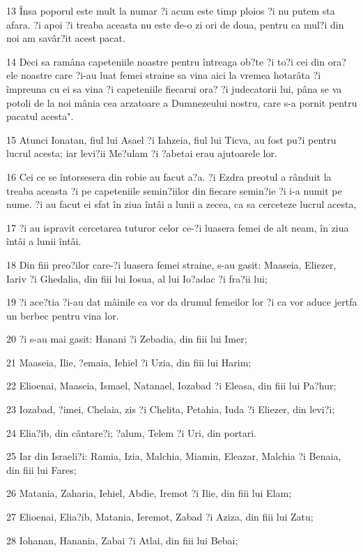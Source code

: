 \par 13 Însa poporul este mult la numar ?i acum este timp ploios ?i nu putem sta afara. ?i apoi ?i treaba aceasta nu este de-o zi ori de doua, pentru ca mul?i din noi am savâr?it acest pacat.
\par 14 Deci sa ramâna capeteniile noastre pentru întreaga ob?te ?i to?i cei din ora?ele noastre care ?i-au luat femei straine sa vina aici la vremea hotarâta ?i împreuna cu ei sa vina ?i capeteniile fiecarui ora? ?i judecatorii lui, pâna se va potoli de la noi mânia cea arzatoare a Dumnezeului nostru, care s-a pornit pentru pacatul acesta".
\par 15 Atunci Ionatan, fiul lui Asael ?i Iahzeia, fiul lui Ticva, au fost pu?i pentru lucrul acesta; iar levi?ii Me?ulam ?i ?abetai erau ajutoarele lor.
\par 16 Cei ce se întorsesera din robie au facut a?a. ?i Ezdra preotul a rânduit la treaba aceasta ?i pe capeteniile semin?iilor din fiecare semin?ie ?i i-a numit pe nume. ?i au facut ei sfat în ziua întâi a lunii a zecea, ca sa cerceteze lucrul acesta,
\par 17 ?i au ispravit cercetarea tuturor celor ce-?i luasera femei de alt neam, în ziua întâi a lunii întâi.
\par 18 Din fiii preo?ilor care-?i luasera femei straine, s-au gasit: Maaseia, Eliezer, Iariv ?i Ghedalia, din fiii lui Iosua, al lui Io?adac ?i fra?ii lui;
\par 19 ?i ace?tia ?i-au dat mâinile ca vor da drumul femeilor lor ?i ca vor aduce jertfa un berbec pentru vina lor.
\par 20 ?i s-au mai gasit: Hanani ?i Zebadia, din fiii lui Imer;
\par 21 Maaseia, Ilie, ?emaia, Iehiel ?i Uzia, din fiii lui Harim;
\par 22 Elioenai, Maaseia, Ismael, Natanael, Iozabad ?i Eleasa, din fiii lui Pa?hur;
\par 23 Iozabad, ?imei, Chelaia, zis ?i Chelita, Petahia, Iuda ?i Eliezer, din levi?i;
\par 24 Elia?ib, din cântare?i; ?alum, Telem ?i Uri, din portari.
\par 25 Iar din Israeli?i: Ramia, Izia, Malchia, Miamin, Eleazar, Malchia ?i Benaia, din fiii lui Fares;
\par 26 Matania, Zaharia, Iehiel, Abdie, Iremot ?i Ilie, din fiii lui Elam;
\par 27 Elioenai, Elia?ib, Matania, Ieremot, Zabad ?i Aziza, din fiii lui Zatu;
\par 28 Iohanan, Hanania, Zabai ?i Atlai, din fiii lui Bebai;

